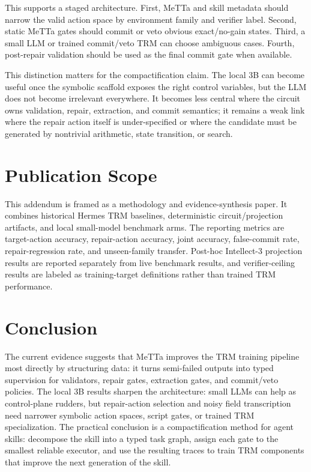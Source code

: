 \documentclass[11pt]{article}
\begin{document}
This supports a staged architecture. First, MeTTa and skill metadata should narrow the valid action space by environment family and verifier label. Second, static MeTTa gates should commit or veto obvious exact/no-gain states. Third, a small LLM or trained commit/veto TRM can choose ambiguous cases. Fourth, post-repair validation should be used as the final commit gate when available.

This distinction matters for the compactification claim. The local 3B can become useful once the symbolic scaffold exposes the right control variables, but the LLM does not become irrelevant everywhere. It becomes less central where the circuit owns validation, repair, extraction, and commit semantics; it remains a weak link where the repair action itself is under-specified or where the candidate must be generated by nontrivial arithmetic, state transition, or search.

\section{Publication Scope}

This addendum is framed as a methodology and evidence-synthesis paper. It combines historical Hermes TRM baselines, deterministic circuit/projection artifacts, and local small-model benchmark arms. The reporting metrics are target-action accuracy, repair-action accuracy, joint accuracy, false-commit rate, repair-regression rate, and unseen-family transfer. Post-hoc Intellect-3 projection results are reported separately from live benchmark results, and verifier-ceiling results are labeled as training-target definitions rather than trained TRM performance.
\section{Conclusion}

The current evidence suggests that MeTTa improves the TRM training pipeline most directly by structuring data: it turns semi-failed outputs into typed supervision for validators, repair gates, extraction gates, and commit/veto policies. The local 3B results sharpen the architecture: small LLMs can help as control-plane rudders, but repair-action selection and noisy field transcription need narrower symbolic action spaces, script gates, or trained TRM specialization. The practical conclusion is a compactification method for agent skills: decompose the skill into a typed task graph, assign each gate to the smallest reliable executor, and use the resulting traces to train TRM components that improve the next generation of the skill.



\end{document}
